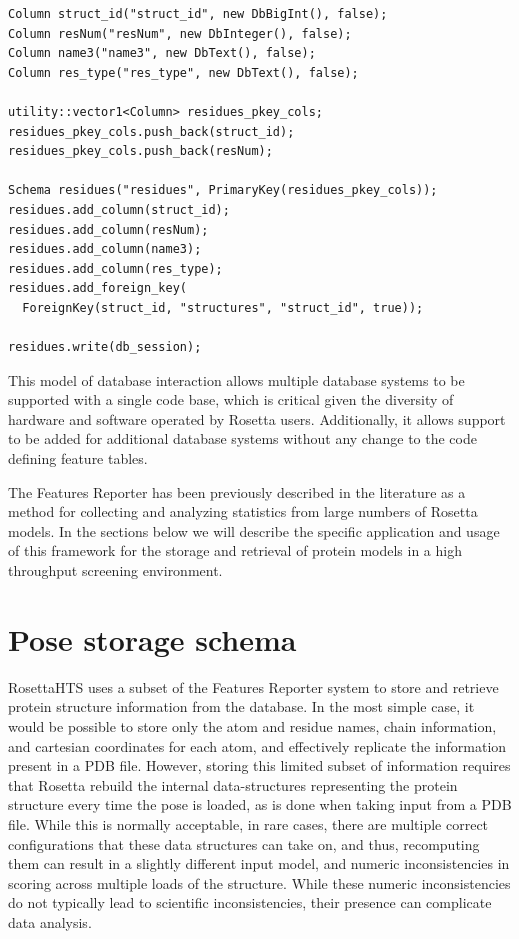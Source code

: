 \singlespace
\begin{Verbatim}
Column struct_id("struct_id", new DbBigInt(), false);
Column resNum("resNum", new DbInteger(), false);
Column name3("name3", new DbText(), false);
Column res_type("res_type", new DbText(), false);

utility::vector1<Column> residues_pkey_cols;
residues_pkey_cols.push_back(struct_id);
residues_pkey_cols.push_back(resNum);

Schema residues("residues", PrimaryKey(residues_pkey_cols));
residues.add_column(struct_id);
residues.add_column(resNum);
residues.add_column(name3);
residues.add_column(res_type);
residues.add_foreign_key(
  ForeignKey(struct_id, "structures", "struct_id", true));

residues.write(db_session);
\end{Verbatim}
\doublespace

This model of database interaction allows multiple database systems to be supported with a single code base, which is critical given the diversity of hardware and software operated by Rosetta users.
Additionally, it allows support to be added for additional database systems without any change to the code defining feature tables. 

The Features Reporter has been previously described in the literature \citep{LeaverFay:2013fn} as a method for collecting and analyzing statistics from large numbers of Rosetta models.  
In the sections below we will describe the specific application and usage of this framework for the storage and retrieval of protein models in a high throughput screening environment. 

\section{Pose storage schema}

RosettaHTS uses a subset of the Features Reporter system to store and retrieve protein structure information from the database.
In the most simple case, it would be possible to store only the atom and residue names, chain information, and cartesian coordinates for each atom, and effectively replicate the information present in a \ac{PDB} file.
However, storing this limited subset of information requires that Rosetta rebuild the internal data-structures representing the protein structure every time the pose is loaded, as is done when taking input from a \ac{PDB} file.
While this is normally acceptable, in rare cases, there are multiple correct configurations that these data structures can take on, and thus, recomputing them can result in a slightly different input model, and numeric inconsistencies in scoring across multiple loads of the structure.
While these  numeric inconsistencies do not typically lead to scientific inconsistencies, their presence can complicate data analysis.

